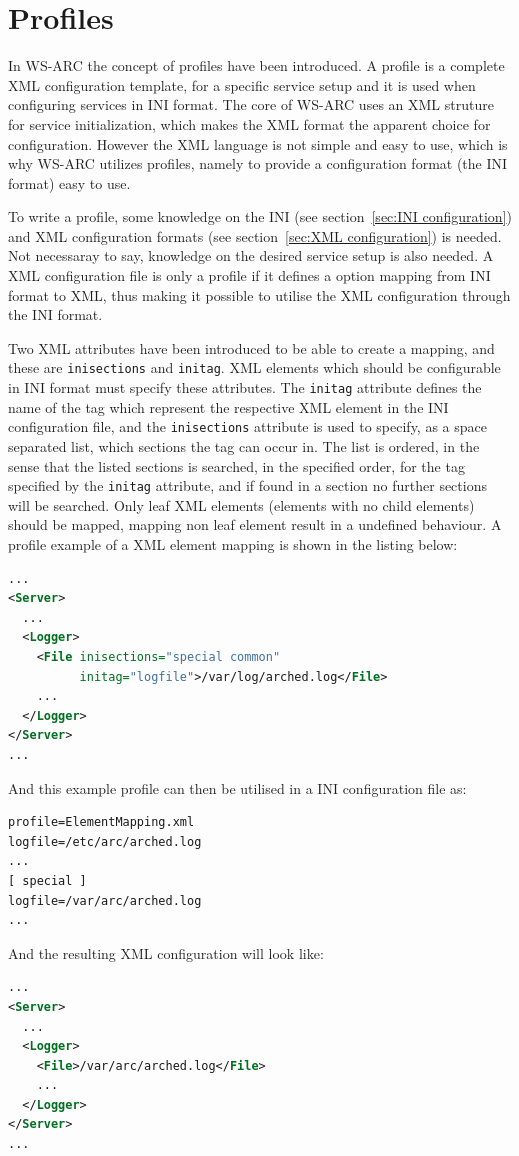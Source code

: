 \documentclass{article}
\begin{document}
\section{Profiles}\label{sec:Profiles}
In WS-ARC the concept of profiles have been introduced. A profile is a complete
XML configuration template, for a specific service setup and it is used when
configuring services in INI format. The core of WS-ARC
uses an XML struture for service initialization, which makes the XML format
the apparent choice for configuration. However the XML language is not simple
and easy to use, which is why WS-ARC utilizes profiles, namely to provide a
configuration format (the INI format) easy to use.

To write a profile, some knowledge on the INI (see
section~\ref{sec:INI configuration}) and XML configuration formats (see
section~\ref{sec:XML configuration}) is needed. Not necessaray to say, knowledge
on the desired service setup is also needed. A XML configuration file is only a
profile if it defines a option mapping from INI format to XML, thus making it
possible to utilise the XML configuration through the INI format.

Two XML attributes have been introduced to be able to create a mapping, and
these are \texttt{inisections} and \texttt{initag}. XML elements which should be
configurable in INI format must specify these attributes. The \texttt{initag}
attribute defines the name of the tag which represent the respective XML element
in the INI configuration file, and the \texttt{inisections} attribute is used to
specify, as a space separated list, which sections the tag can occur in. The
list is ordered, in the sense that the listed sections is searched, in the
specified order, for the tag specified by the \texttt{initag} attribute, and if
found in a section no further sections will be searched. Only leaf XML elements
(elements with no child elements) should be mapped, mapping non leaf element
result in a undefined behaviour. A profile example of a XML element mapping is
shown in the listing below:
\begin{lstlisting}[language=xml,title=ElementMapping.xml]
...
<Server>
  ...
  <Logger>
    <File inisections="special common"
          initag="logfile">/var/log/arched.log</File>
    ...
  </Logger>
</Server>
...
\end{lstlisting}
And this example profile can then be utilised in a INI configuration file as:
\begin{lstlisting}[language=xml,title=ElementMapping.ini]
profile=ElementMapping.xml
logfile=/etc/arc/arched.log
...
[ special ]
logfile=/var/arc/arched.log
...
\end{lstlisting}
And the resulting XML configuration will look like:
\begin{lstlisting}[language=xml]
...
<Server>
  ...
  <Logger>
    <File>/var/arc/arched.log</File>
    ...
  </Logger>
</Server>
...
\end{lstlisting}
\end{document}
